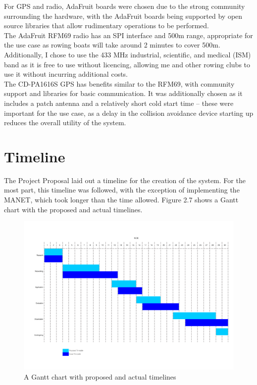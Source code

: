 \documentclass[12pt,a4paper]{report}
\begin{document}
For GPS and radio, AdaFruit boards were chosen due to the strong community surrounding the hardware, with the AdaFruit boards being supported by open source libraries that allow rudimentary operations to be performed. \\
The AdaFruit RFM69 radio has an SPI interface and 500m range, appropriate for the use case as rowing boats will take around 2 minutes to cover 500m. Additionally, I chose to use the 433 MHz industrial, scientific, and medical (ISM) band as it is free to use without licencing, allowing me and other rowing clubs to use it without incurring additional costs. \\
The CD-PA1616S GPS has benefits similar to the RFM69, with community support and libraries for basic communication. It was additionally chosen as it includes a patch antenna and a relatively short cold start time -- these were important for the use case, as a delay in the collision avoidance device starting up reduces the overall utility of the system. \\

\section{Timeline}
The Project Proposal laid out a timeline for the creation of the system. For the most part, this timeline was followed, with the exception of implementing the MANET, which took longer than the time allowed. Figure 2.7 shows a Gantt chart with the proposed and actual timelines.
\begin{figure}[h]
\begin{center}
\includegraphics[scale=0.5]{gantt.pdf}
\end{center}
\caption{A Gantt chart with proposed and actual timelines}
\end{figure}
\end{document}
